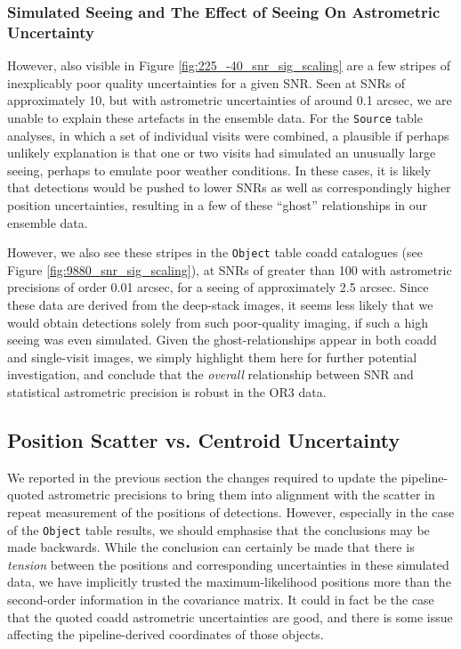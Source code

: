 \documentclass[SE,lsstdraft,authoryear,toc]{lsstdoc}
\begin{document}
\subsubsection{Simulated Seeing and The Effect of Seeing On Astrometric Uncertainty}
However, also visible in Figure \ref{fig:225_-40_snr_sig_scaling} are a few stripes of inexplicably poor quality uncertainties for a given SNR.
Seen at SNRs of approximately 10, but with astrometric uncertainties of around 0.1 arcsec, we are unable to explain these artefacts in the ensemble data.
For the \texttt{Source} table analyses, in which a set of individual visits were combined, a plausible if perhaps unlikely explanation is that one or two visits had simulated an unusually large seeing, perhaps to emulate poor weather conditions.
In these cases, it is likely that detections would be pushed to lower SNRs as well as correspondingly higher position uncertainties, resulting in a few of these ``ghost'' relationships in our ensemble data.

However, we also see these stripes in the \texttt{Object} table coadd catalogues (see Figure \ref{fig:9880_snr_sig_scaling}), at SNRs of greater than 100 with astrometric precisions of order 0.01 arcsec, for a seeing of approximately 2.5 arcsec.
Since these data are derived from the deep-stack images, it seems less likely that we would obtain detections solely from such poor-quality imaging, if such a high seeing was even simulated.
Given the ghost-relationships appear in both coadd and single-visit images, we simply highlight them here for further potential investigation, and conclude that the \textit{overall} relationship between SNR and statistical astrometric precision is robust in the OR3 data.

\subsection{Position Scatter vs. Centroid Uncertainty}
We reported in the previous section the changes required to update the pipeline-quoted astrometric precisions to bring them into alignment with the scatter in repeat measurement of the positions of detections.
However, especially in the case of the \texttt{Object} table results, we should emphasise that the conclusions may be made backwards.
While the conclusion can certainly be made that there is \textit{tension} between the positions and corresponding uncertainties in these simulated data, we have implicitly trusted the maximum-likelihood positions more than the second-order information in the covariance matrix.
It could in fact be the case that the quoted coadd astrometric uncertainties are good, and there is some issue affecting the pipeline-derived coordinates of those objects.
\end{document}
